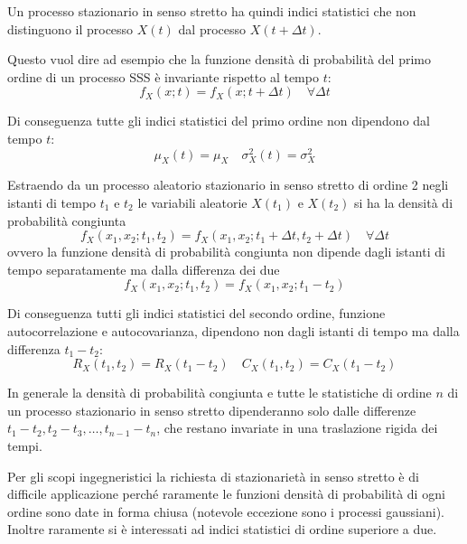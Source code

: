 Un processo stazionario in senso stretto ha quindi indici statistici che non distinguono il processo $X(t)$ dal processo $X(t+\Delta t)$.

Questo vuol dire ad esempio che la funzione densità di probabilità del primo ordine di un processo SSS è invariante rispetto al tempo $t$:
\[
	f_X(x;t)=f_X(x;t+\Delta t)\quad\forall\Delta t
\]

Di conseguenza tutte gli indici statistici del primo ordine non dipendono dal tempo $t$:
\[
	\mu_X(t)=\mu_X\quad \sigma^2_X(t)=\sigma^2_X
\]

Estraendo da un processo aleatorio stazionario in senso stretto di ordine 2 negli istanti di tempo $t_1$ e $t_2$ le variabili aleatorie $X(t_1)$ e $X(t_2)$ si ha la densità di probabilità congiunta
\[
	f_X(x_1,x_2;t_1,t_2)=f_X(x_1,x_2;t_1+\Delta t,t_2+\Delta t)\quad\forall\Delta t
\]
ovvero la funzione densità di probabilità congiunta non dipende dagli istanti di tempo separatamente ma dalla differenza dei due
\begin{equation}
	f_X(x_1,x_2;t_1,t_2)=f_X(x_1,x_2;t_1-t_2)
\end{equation}

Di conseguenza tutti gli indici statistici del secondo ordine, funzione autocorrelazione e autocovarianza, dipendono non dagli istanti di tempo ma dalla differenza $t_1-t_2$:
\[
	R_X(t_1,t_2)=R_X(t_1-t_2)\quad C_X(t_1,t_2)=C_X(t_1-t_2)
\]

In generale la densità di probabilità congiunta e tutte le statistiche di ordine $n$ di un processo stazionario in senso stretto dipenderanno solo dalle differenze $t_1-t_2, t_2-t_3, \dots, t_{n-1}-t_n$, che restano invariate in una traslazione rigida dei tempi.

\begin{nota}
	Per gli scopi ingegneristici la richiesta di stazionarietà in senso stretto è di difficile applicazione perché raramente le funzioni densità di probabilità di ogni ordine sono date in forma chiusa (notevole eccezione sono i processi gaussiani). Inoltre raramente si è interessati ad indici statistici di ordine superiore a due.
\end{nota}

